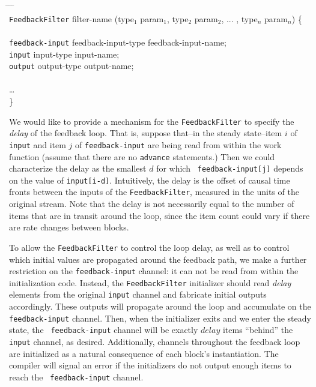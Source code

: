 \documentclass[draft]{article}
\begin{document}
\begin{tabbing}
\hspace{0.2in} \= \hspace{0.2in} \= \hspace{0.2in} \= \hspace{0.2in} \= \\

{\tt FeedbackFilter} filter-name (type$_1$ param$_1$, type$_2$ param$_2$,
... , type$_n$ param$_n$) \{ \\ \\

\> {\tt feedback-input} feedback-input-type feedback-input-name; \\
\> {\tt input} input-type input-name; \\
\> {\tt output} output-type output-name; \\ \\

\> \dots \\
\}
\end{tabbing}

We would like to provide a mechanism for the {\tt FeedbackFilter} to
specify the {\it delay} of the feedback loop.  That is, suppose
that--in the steady state--item $i$ of {\tt input} and item $j$ of
{\tt feedback-input} are being read from within the work function
(assume that there are no {\tt advance} statements.)  Then we could
characterize the delay as the smallest $d$ for which {\tt
feedback-input[j]} depends on the value of {\tt input[i-d]}.
Intuitively, the delay is the offset of causal time fronts between the
inputs of the {\tt FeedbackFilter}, measured in the units of the
original stream.  Note that the delay is not necessarily equal to the
number of items that are in transit around the loop, since the item
count could vary if there are rate changes between blocks.

To allow the {\tt FeedbackFilter} to control the loop delay, as well
as to control which initial values are propagated around the feedback
path, we make a further restriction on the {\tt feedback-input}
channel: it can not be read from within the initialization code.
Instead, the {\tt FeedbackFilter} initializer should read {\it delay}
elements from the original {\tt input} channel and fabricate initial
outputs accordingly.  These outputs will propagate around the loop and
accumulate on the {\tt feedback-input} channel.  Then, when the
initializer exits and we enter the steady state, the {\tt
feedback-input} channel will be exactly $delay$ items ``behind'' the
{\tt input} channel, as desired.  Additionally, channels throughout
the feedback loop are initialized as a natural consequence of each
block's instantiation.  The compiler will signal an error if the
initializers do not output enough items to reach the {\tt
feedback-input} channel.
\end{document}
